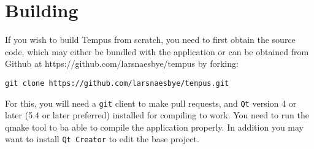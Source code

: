 \section{Building}

If you wish to build Tempus from scratch, you need to first obtain the source code, which may either be bundled with the application or can be obtained from Github at https://github.com/larsnaesbye/tempus by forking:

\texttt{git clone https://github.com/larsnaesbye/tempus.git}

For this, you will need a \texttt{git} client to make pull requests, and \texttt{Qt} version 4 or later (5.4 or later preferred) installed for compiling to work. 
You need to run the qmake tool to ba able to compile the application properly.
In addition you may want to install \texttt{Qt Creator} to edit the base project.